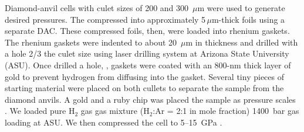 \documentclass[draft,jgrga,12pt]{agujournal2019}
\begin{document}
Diamond-anvil cells with culet sizes of 200 and 300~{$\mu\mathrm{m}$} were used to generate desired pressures. 
The   compressed into approximately 5\,{$\mu\mathrm{m}$}-thick foils using a separate DAC\@. 
These compressed foils, then, were loaded into rhenium gaskets. 
The rhenium gaskets were indented to about 20~{$\mu\mathrm{m}$} in thickness and drilled with a hole  2/3 the culet size using  laser drilling system at Arizona State University (ASU). 
Once drilled a hole, ,  gaskets  were coated with an 800-nm thick layer of gold to prevent hydrogen from diffusing into the gasket. 
Several tiny pieces of starting material  were placed on both cullets to separate the sample  from the  diamond anvils. 
A gold  and a ruby chip was placed  the sample  as pressure scales \cite{fei_internally_2007, mao_calibration_1986}. %
We loaded pure H$_2$ gas   gas mixture (H$_2$:Ar = 2:1 in mole fraction)   
 1400~bar   gas loading  at ASU\@. 
We then compressed the  cell to 5--15~GPa  \cite{mao_calibration_1986}. 
\end{document}

